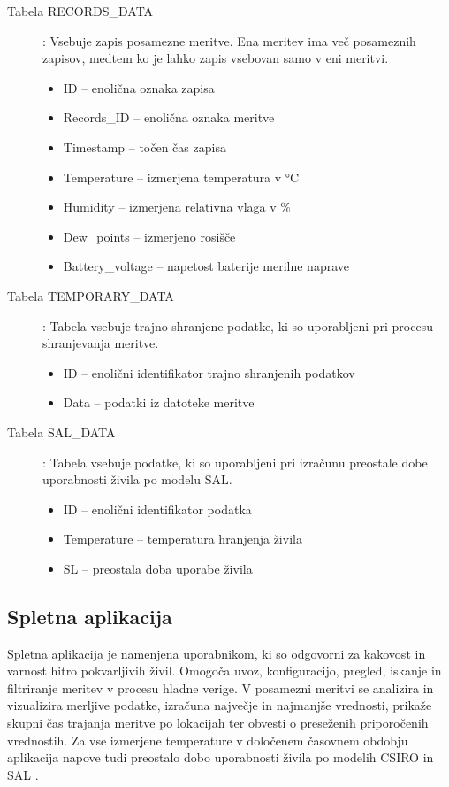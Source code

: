 \documentclass[a4paper, 12pt]{book}
\begin{document}
\begin{description}
\item[Tabela RECORDS\_DATA] : Vsebuje zapis posamezne meritve. Ena meritev ima več posameznih zapisov, medtem ko je lahko zapis vsebovan samo v eni meritvi.
	\begin{itemize}
		\item ID – enolična oznaka zapisa
		\item Records\_ID – enolična oznaka meritve
		\item Timestamp – točen čas zapisa
		\item Temperature – izmerjena temperatura v °C
		\item Humidity – izmerjena relativna vlaga v \%
		\item Dew\_points – izmerjeno rosišče
		\item Battery\_voltage – napetost baterije merilne naprave
	\end{itemize}
	
\item[Tabela TEMPORARY\_DATA] : Tabela vsebuje trajno shranjene podatke, ki so uporabljeni pri procesu shranjevanja meritve.
	\begin{itemize}
		\item ID – enolični identifikator trajno shranjenih podatkov
		\item Data – podatki iz datoteke meritve
	\end{itemize}

\item[Tabela SAL\_DATA] : Tabela vsebuje podatke, ki so uporabljeni pri izračunu preostale dobe uporabnosti živila po modelu SAL.
	\begin{itemize}
		\item ID – enolični identifikator podatka
		\item Temperature – temperatura hranjenja živila
		\item SL – preostala doba uporabe živila
	\end{itemize}
\end{description}



\subsection{Spletna aplikacija}

Spletna aplikacija je namenjena uporabnikom, ki so odgovorni za kakovost in varnost hitro pokvarljivih živil. Omogoča uvoz, konfiguracijo, pregled, iskanje in filtriranje meritev v procesu hladne verige. V posamezni meritvi se analizira in vizualizira merljive podatke, izračuna največje in najmanjše vrednosti, prikaže skupni čas trajanja meritve po lokacijah ter obvesti o preseženih priporočenih vrednostih. Za vse izmerjene temperature v določenem časovnem obdobju aplikacija napove tudi preostalo dobo uporabnosti živila po modelih CSIRO in SAL \cite{magistrska-marolt}.
\end{document}
